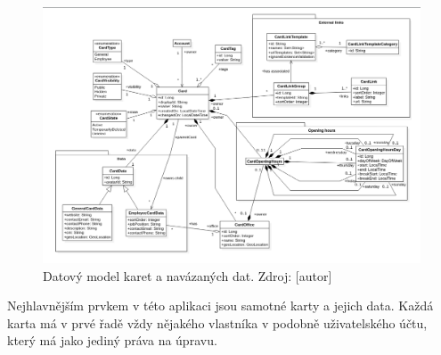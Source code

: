 		\begin{figure}[H]
			\centering
			\includegraphics[width=\linewidth]{obrazky/datovy_model_karta}\hfill
			\caption{Datový model karet a navázaných dat. Zdroj: [autor]}
		\end{figure}

		Nejhlavnějším prvkem v této aplikaci jsou samotné karty a jejich data.
		Každá karta má v prvé řadě vždy nějakého vlastníka v podobně uživatelského účtu, který má jako jediný práva na
		úpravu.

